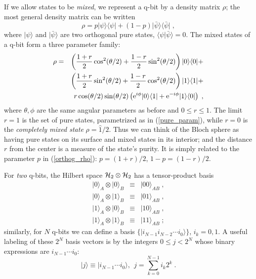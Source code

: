 \documentclass[12pt]{article}
\def\bra#1{{\langle #1 |}}
\def\ket#1{{| #1 \rangle}}
\def\bracket#1#2{{\langle #1 | #2 \rangle}}
\def\id{{\hat 1}}
\def\e{{\rm e}}
\begin{document}
If we allow states to be {\it mixed}, we represent a q-bit by a density
matrix $\rho$; the most general density matrix can be written
\begin{equation}
\rho = p \ket\psi\bra\psi + (1-p) \ket{\bar\psi}\bra{\bar\psi} \;,
\label{orthog_rho}
\end{equation}
where $\ket\psi$ and $\ket{\bar\psi}$ are two orthogonal pure states,
$\bracket\psi{\bar\psi}=0$.  The mixed states of a q-bit
form a three parameter family:
\begin{eqnarray}
\rho &=& \left( {1+r\over2}\cos^2(\theta/2)
  + {1-r\over2}\sin^2(\theta/2) \right) \ket0\bra0 + \nonumber\\
&& \left( {1+r\over2}\sin^2(\theta/2)
  + {1-r\over2}\cos^2(\theta/2) \right) \ket1\bra1 + \nonumber\\
&& r \cos(\theta/2) \sin(\theta/2)
  \left( \e^{i\phi} \ket0\bra1 + \e^{-i\phi} \ket1\bra0 \right) \;,
\label{qbit_mixed}
\end{eqnarray}
where $\theta,\phi$ are the same angular parameters as before and
$0\le r \le 1$.  The limit $r=1$ is the set of pure states, parametrized as
in (\ref{pure_param}), while $r=0$ is the {\it completely mixed state}
$\rho=\id/2$.
Thus we can think of the Bloch sphere as having pure states on its surface
and mixed states in its interior; and the distance $r$ from the center is a
measure of the state's purity.  It is simply related to the parameter
$p$ in (\ref{orthog_rho}):  $p = (1+r)/2$, $1-p = (1-r)/2$.

For {\it two} q-bits, the Hilbert space ${\cal H}_2\otimes{\cal H}_2$
has a tensor-product basis
\begin{eqnarray}
\ket{0}_A\otimes\ket{0}_B &\equiv& \ket{00}_{AB} \;, \nonumber\\
\ket{0}_A\otimes\ket{1}_B &\equiv& \ket{01}_{AB} \;, \nonumber\\
\ket{1}_A\otimes\ket{0}_B &\equiv& \ket{10}_{AB} \;, \nonumber\\
\ket{1}_A\otimes\ket{1}_B &\equiv& \ket{11}_{AB} \;;
\end{eqnarray}
similarly, for $N$ q-bits we can define a basis
$\{ \ket{i_{N-1}i_{N-2}\cdots i_0} \}$, $i_k=0,1$.  A useful labeling of
these $2^N$ basis vectors is by the integers $0\le j < 2^N$ whose
binary expressions are $i_{N-1}\cdots i_0$:
\begin{equation}
\ket{j} \equiv \ket{i_{N-1}\cdots i_0},\ \ 
  j = \sum_{k=0}^{N-1} i_k 2^k \;.
\end{equation}
\end{document}
